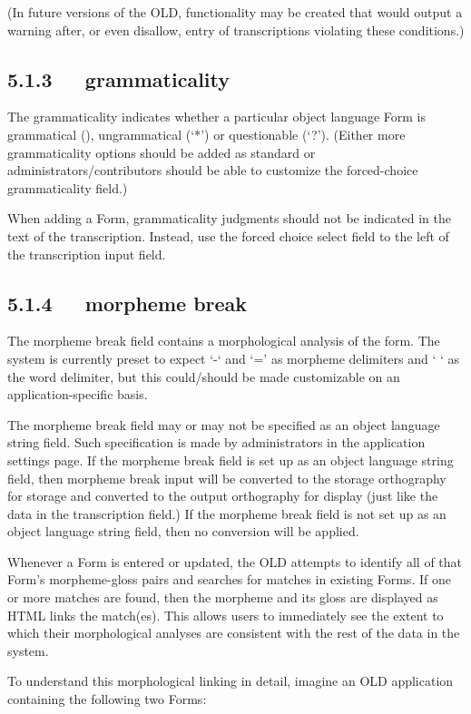 \documentclass[letterpaper,10pt,english]{sphinxmanual}
\begin{document}
(In future versions of the OLD, functionality may be created that
would output a warning after, or even disallow, entry of transcriptions
violating these conditions.)


\subsection{5.1.3   grammaticality}
\label{user_guide:grammaticality}
The grammaticality indicates whether a particular object language Form is
grammatical (), ungrammatical (`*') or questionable (`?').  (Either more
grammaticality options should be added as standard or
administrators/contributors should be able to customize the forced-choice
grammaticality field.)

When adding a Form, grammaticality judgments should not be indicated in the text
of the transcription.  Instead, use the forced choice select field to the left
of the transcription input field.


\subsection{5.1.4   morpheme break}
\label{user_guide:morpheme-break}
The morpheme break field contains a morphological analysis of the form.  The
system is currently preset to expect `-` and `=' as morpheme delimiters and ` `
as the word delimiter, but this could/should be made customizable on an
application-specific basis.

The morpheme break field may or may not be specified as an object language
string field.  Such specification is made by administrators in the application
settings page.  If the morpheme break field is set up as an object language
string field, then morpheme break input will be converted to the storage
orthography for storage and converted to the output orthography for display
(just like the data in the transcription field.)  If the morpheme break field is
not set up as an object language string field, then no conversion will be
applied.

Whenever a Form is entered or updated, the OLD attempts to identify all of that
Form's morpheme-gloss pairs and searches for matches in existing Forms.  If one
or more matches are found, then the morpheme and its gloss are displayed as HTML
links the match(es).  This allows users to immediately see the extent to which
their morphological analyses are consistent with the rest of the data in the
system.

To understand this morphological linking in detail, imagine an OLD application
containing the following two Forms:
\end{document}
